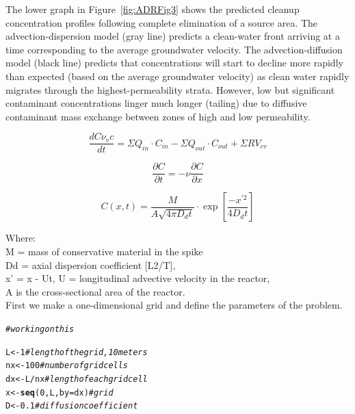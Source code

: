 \documentclass{tufte-handout}\usepackage[]{graphicx}\usepackage[]{xcolor}
\makeatletter
\newcommand{\hlnum}[1]{\textcolor[rgb]{0.686,0.059,0.569}{#1}}%
\newcommand{\hlcom}[1]{\textcolor[rgb]{0.678,0.584,0.686}{\textit{#1}}}%
\newcommand{\hlopt}[1]{\textcolor[rgb]{0,0,0}{#1}}%
\newcommand{\hlstd}[1]{\textcolor[rgb]{0.345,0.345,0.345}{#1}}%
\newcommand{\hlkwb}[1]{\textcolor[rgb]{0.69,0.353,0.396}{#1}}%
\newcommand{\hlkwc}[1]{\textcolor[rgb]{0.333,0.667,0.333}{#1}}%
\newcommand{\hlkwd}[1]{\textcolor[rgb]{0.737,0.353,0.396}{\textbf{#1}}}%
\newenvironment{kframe}{%
 \def\at@end@of@kframe{}%
 \ifinner\ifhmode%
  \def\at@end@of@kframe{\end{minipage}}%
  \begin{minipage}{\columnwidth}%
 \fi\fi%
 \def\FrameCommand##1{\hskip\@totalleftmargin \hskip-\fboxsep
 \colorbox{shadecolor}{##1}\hskip-\fboxsep
     \hskip-\linewidth \hskip-\@totalleftmargin \hskip\columnwidth}%
 \MakeFramed {\advance\hsize-\width
   \@totalleftmargin\z@ \linewidth\hsize
   \@setminipage}}%
 {\par\unskip\endMakeFramed%
 \at@end@of@kframe}
\newenvironment{knitrout}{}{} %
\makeatother
\begin{document}
The lower graph in Figure~\ref{fig:ADRFig3} shows the predicted cleanup concentration profiles following complete elimination of a source area. The advection-dispersion model (gray line) predicts a clean-water front arriving at a time corresponding to the average groundwater velocity. The advection-diffusion model (black line) predicts that concentrations will start to decline more rapidly than expected (based on the average groundwater velocity) as clean water rapidly migrates through the highest-permeability strata. However, low but significant contaminant concentrations linger much longer (tailing) due to diffusive contaminant mass exchange between zones of high and low permeability.

\begin{equation}
\frac{d C\nu_vc}{d t} = \Sigma Q_{in} \cdot C_{in} - \Sigma Q_{out} \cdot C_{out} + \Sigma R V_{cv}
\end{equation}


\begin{equation}
  \frac{\partial C}{\partial t} = - \nu \frac{\partial C}{\partial x}
\end{equation}

\begin{equation}
C(x,t) = \frac{M}{A \sqrt{4\pi D_d t}} \cdot \exp[\frac{−x^{\prime 2}}{4D_d t}]
\end{equation}

Where:\\
M = mass of conservative material in the spike\\
Dd = axial dispersion coefficient [L2/T],\\
x’ = x - Ut, U = longitudinal advective velocity in the reactor,\\
A is the cross-sectional area of the reactor.\\

First we make a one-dimensional grid and define the parameters of the problem.

\begin{knitrout}
\color{fgcolor}\begin{kframe}
\begin{alltt}
\hlcom{# working on this}

\hlstd{L} \hlkwb{<-} \hlnum{1} \hlcom{# length of the grid, 10 meters}
\hlstd{nx} \hlkwb{<-} \hlnum{100} \hlcom{# number of grid cells}
\hlstd{dx} \hlkwb{<-} \hlstd{L}\hlopt{/}\hlstd{nx} \hlcom{# length of each grid cell}
\hlstd{x} \hlkwb{<-} \hlkwd{seq}\hlstd{(}\hlnum{0}\hlstd{, L,} \hlkwc{by}\hlstd{=dx)} \hlcom{# grid}
\hlstd{D} \hlkwb{<-} \hlnum{0.1} \hlcom{# diffusion coefficient}
\end{alltt}
\end{kframe}
\end{knitrout}
\end{document}
